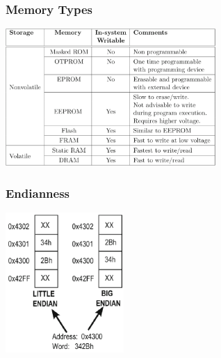 \begin{multicols}{2}
\subsubsection{Memory Types}
\includegraphics[width=8cm]{images/memorytypes.png}

\subsubsection{Endianness}
\includegraphics[width=4.5cm]{images/be_le.png}
\end{multicols}

